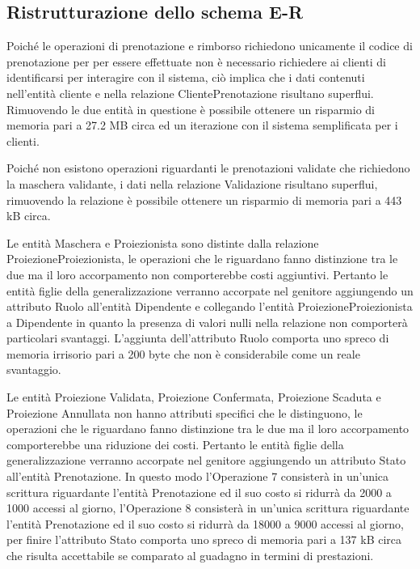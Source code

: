 \pagebreak
\subsection*{Ristrutturazione dello schema E-R}
%
%

Poiché le operazioni di prenotazione e rimborso richiedono unicamente il codice
di prenotazione per per essere effettuate non è necessario richiedere ai clienti
di identificarsi per interagire con il sistema, ciò implica che i dati
contenuti nell'entità cliente e nella relazione ClientePrenotazione risultano
superflui. Rimuovendo le due entità in questione è possibile ottenere un
risparmio di memoria pari a %
27.2 MB circa ed un iterazione con il sistema semplificata per i clienti.

Poiché non esistono operazioni riguardanti le prenotazioni validate che
richiedono la maschera validante, i dati nella relazione Validazione risultano
superflui, rimuovendo la relazione è possibile ottenere un risparmio di memoria
pari a %
443 kB circa.

Le entità Maschera e Proiezionista sono distinte dalla relazione
ProiezioneProiezionista, le operazioni che le riguardano fanno distinzione tra
le due ma il loro accorpamento non comporterebbe costi aggiuntivi.
Pertanto le entità figlie della generalizzazione verranno accorpate nel
genitore aggiungendo un attributo Ruolo all'entità Dipendente e collegando
l'entità ProiezioneProiezionista a Dipendente in quanto la presenza di valori
nulli nella relazione non comporterà particolari svantaggi.
L'aggiunta dell'attributo Ruolo comporta uno spreco di memoria irrisorio pari a
200 byte che non è considerabile come un reale svantaggio.

Le entità Proiezione Validata, Proiezione Confermata, Proiezione Scaduta e
Proiezione Annullata non hanno attributi specifici che le distinguono,
le operazioni che le riguardano fanno distinzione tra le due ma il loro
accorpamento comporterebbe una riduzione dei costi.
Pertanto le entità figlie della generalizzazione verranno accorpate nel
genitore aggiungendo un attributo Stato all'entità Prenotazione.
In questo modo
l'Operazione 7 consisterà in un'unica scrittura riguardante
l'entità Prenotazione ed il suo costo si ridurrà da 2000 a 1000 accessi
al giorno,
l'Operazione 8 consisterà in un'unica scrittura riguardante
l'entità Prenotazione ed il suo costo si ridurrà da 18000 a 9000 accessi
al giorno,
per finire l'attributo Stato comporta uno spreco di memoria pari a
137 kB circa che risulta accettabile se comparato al guadagno in termini di
prestazioni.

